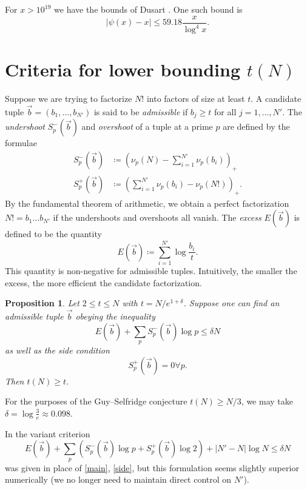 \documentclass[12pt,a4paper,reqno]{amsart}
\numberwithin{equation}{section}
\theoremstyle{plain}
\newtheorem{proposition}[theorem]{Proposition}
\theoremstyle{definition}
\begin{document}
  For $x > 10^{19}$ we have the bounds of Dusart \cite{dusart}.  One such bound is
  $$ |\psi(x) - x| \leq 59.18 \frac{x}{\log^4 x}.$$
  
  

  
\section{Criteria for lower bounding $t(N)$}

Suppose we are trying to factorize $N!$ into factors of size at least $t$.  A candidate tuple $\vec b = (b_1,\dots,b_{N'})$ is said to be \emph{admissible} if $b_j \geq t$ for all $j=1,\dots,N'$.  The \emph{undershoot} $S^-_p(\vec b)$ and \emph{overshoot} of a tuple at a prime $p$ are defined by the formulae
\begin{align*}
   S^-_p(\vec b) &\coloneqq (\nu_p(N) - \sum_{i=1}^{N'} \nu_p(b_i))_+ \\
   S^+_p(\vec b) &\coloneqq (\sum_{i=1}^{N'} \nu_p(b_i) - \nu_p(N!))_+.
\end{align*}
By the fundamental theorem of arithmetic, we obtain a perfect factorization $N! = b_1 \dots b_{N'}$ if the undershoots and overshoots all vanish.  The \emph{excess} $E(\vec b)$ is defined to be the quantity
\begin{equation}\label{excess} 
  E(\vec b) \coloneqq \sum_{i=1}^{N'} \log \frac{b_i}{t}.
\end{equation}
This quantity is non-negative for admissible tuples.  Intuitively, the smaller the excess, the more efficient the candidate factorization.

\begin{proposition}  Let $2 \leq t \leq N$ with $t = N /e^{1+\delta}$.  Suppose one can find an admissible tuple $\vec b$ obeying the inequality
\begin{equation}\label{main} 
  E(\vec b) + \sum_p S^-_p(\vec b) \log p  \leq \delta N
\end{equation}
as well as the side condition
\begin{equation}\label{side}
 S^+_p(\vec b) = 0 \forall p.
\end{equation}
Then $t(N) \geq t$.
\end{proposition}

For the purposes of the Guy--Selfridge conjecture $t(N) \geq N/3$, we may take $\delta = \log \frac{3}{e} \approx 0.098$.  

In \cite[Proposition 3.1]{tao} the variant criterion
$$ 
E(\vec b)  + \sum_p (S^-_p(\vec b) \log p + S^+_p(\vec b) \log 2) + |N'-N| \log N \leq \delta N$$
was given in place of \eqref{main}, \eqref{side}, but this formulation seems slightly superior numerically (we no longer need to maintain direct control on $N'$).
\end{document}
